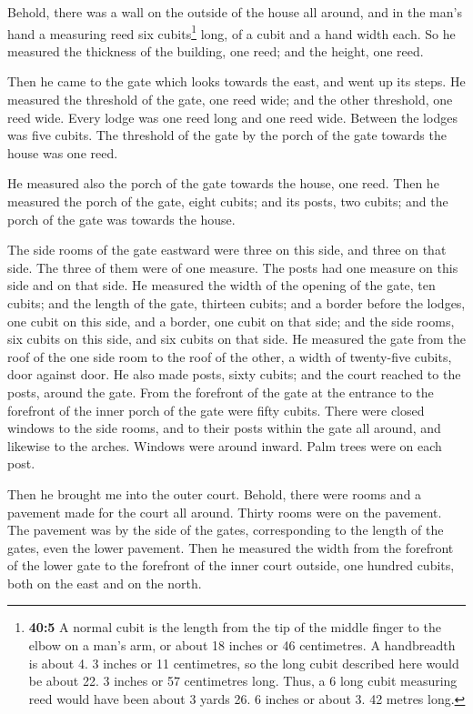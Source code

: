  Behold, there was a wall on the outside of the house all
around, and in the man's hand a measuring reed six cubits\footnote{\textbf{40:5}
  A normal cubit is the length from the tip of the middle finger to the
  elbow on a man's arm, or about 18 inches or 46 centimetres. A
  handbreadth is about 4. 3 inches or 11 centimetres, so the long cubit
  described here would be about 22. 3 inches or 57 centimetres long.
  Thus, a 6 long cubit measuring reed would have been about 3 yards 26.
  6 inches or about 3. 42 metres long.} long, of a cubit and a hand
width each. So he measured the thickness of the building, one reed; and
the height, one reed.

 Then he came to the gate which looks towards the east,
and went up its steps. He measured the threshold of the gate, one reed
wide; and the other threshold, one reed wide.  Every lodge
was one reed long and one reed wide. Between the lodges was five cubits.
The threshold of the gate by the porch of the gate towards the house was
one reed.

 He measured also the porch of the gate towards the house,
one reed.  Then he measured the porch of the gate, eight
cubits; and its posts, two cubits; and the porch of the gate was towards
the house.

 The side rooms of the gate eastward were three on this
side, and three on that side. The three of them were of one measure. The
posts had one measure on this side and on that side.  He
measured the width of the opening of the gate, ten cubits; and the
length of the gate, thirteen cubits;  and a border before
the lodges, one cubit on this side, and a border, one cubit on that
side; and the side rooms, six cubits on this side, and six cubits on
that side.  He measured the gate from the roof of the one
side room to the roof of the other, a width of twenty-five cubits, door
against door.  He also made posts, sixty cubits; and the
court reached to the posts, around the gate.  From the
forefront of the gate at the entrance to the forefront of the inner
porch of the gate were fifty cubits.  There were closed
windows to the side rooms, and to their posts within the gate all
around, and likewise to the arches. Windows were around inward. Palm
trees were on each post.

 Then he brought me into the outer court. Behold, there
were rooms and a pavement made for the court all around. Thirty rooms
were on the pavement.  The pavement was by the side of
the gates, corresponding to the length of the gates, even the lower
pavement.  Then he measured the width from the forefront
of the lower gate to the forefront of the inner court outside, one
hundred cubits, both on the east and on the north.


